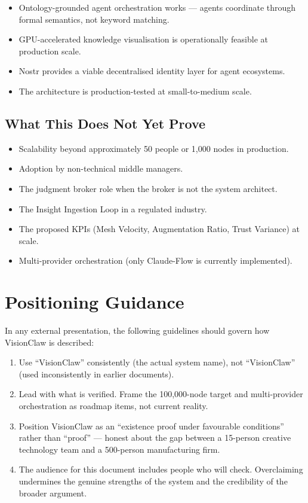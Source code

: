 \begin{itemize}
  \item Ontology-grounded agent orchestration works --- agents coordinate through formal semantics, not keyword matching.
  \item GPU-accelerated knowledge visualisation is operationally feasible at production scale.
  \item Nostr provides a viable decentralised identity layer for agent ecosystems.
  \item The architecture is production-tested at small-to-medium scale.
\end{itemize}

\subsection{What This Does Not Yet Prove}

\begin{itemize}
  \item Scalability beyond approximately 50 people or 1,000 nodes in production.
  \item Adoption by non-technical middle managers.
  \item The judgment broker role when the broker is not the system architect.
  \item The Insight Ingestion Loop in a regulated industry.
  \item The proposed KPIs (Mesh Velocity, Augmentation Ratio, Trust Variance) at scale.
  \item Multi-provider orchestration (only Claude-Flow is currently implemented).
\end{itemize}

\section{Positioning Guidance}

In any external presentation, the following guidelines should govern how VisionClaw is described:

\begin{enumerate}
  \item Use ``VisionClaw'' consistently (the actual system name), not ``VisionClaw'' (used inconsistently in earlier documents).
  \item Lead with what is verified. Frame the 100,000-node target and multi-provider orchestration as roadmap items, not current reality.
  \item Position VisionClaw as an ``existence proof under favourable conditions'' rather than ``proof'' --- honest about the gap between a 15-person creative technology team and a 500-person manufacturing firm.
  \item The audience for this document includes people who will check. Overclaiming undermines the genuine strengths of the system and the credibility of the broader argument.
\end{enumerate}

